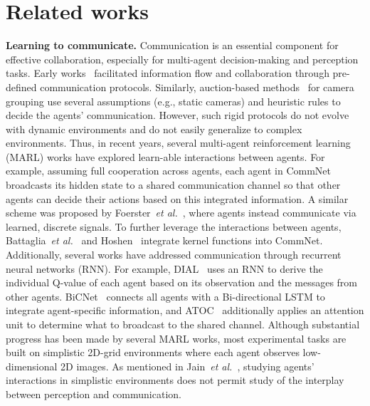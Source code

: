 \section{Related works}

\textbf{Learning to communicate.}
Communication is an essential component for effective collaboration, especially for multi-agent decision-making and perception tasks.  
Early works~\cite{tan1993multi,melo2011querypomdp} facilitated information flow and collaboration through pre-defined communication protocols. Similarly, auction-based methods~\cite{li2010auction,qureshi2008smart} for camera grouping use several assumptions (e.g., static cameras) and heuristic rules to decide the agents’ communication. 
However, such rigid protocols do not evolve with dynamic environments and do not easily generalize to complex environments.  
Thus, in recent years, several multi-agent reinforcement learning (MARL) works have explored learn-able interactions between agents.  
For example, assuming full cooperation across agents, each agent in CommNet~\cite{sukhbaatar2016learning} broadcasts its hidden state to a shared communication channel so that other agents can decide their actions based on this integrated information.  
A similar scheme was proposed by Foerster~\textit{et al.}~\cite{foerster2016learning}, where agents instead communicate via learned, discrete signals.  
To further leverage the interactions between agents, Battaglia~\textit{et al.}~\cite{battaglia2016interaction} and Hoshen~\cite{hoshen2017vain} integrate kernel functions into CommNet.  
Additionally, several works have addressed communication through recurrent neural networks (RNN). 
For example, DIAL~\cite{foerster2016dial} uses an RNN to derive the individual Q-value of each agent based on its observation and the messages from other agents.
BiCNet~\cite{peng2017multiagent} connects all agents with a Bi-directional LSTM to integrate agent-specific information, and ATOC~\cite{jiang2018learning} additionally applies an attention unit to determine what to broadcast to the shared channel.  
Although substantial progress has been made by several MARL works, most experimental tasks are built on simplistic 2D-grid environments where each agent observes low-dimensional 2D images. 
As mentioned in Jain~\textit{et al.}~\cite{jain2019two}, studying agents' interactions in simplistic environments does not permit study of the interplay between perception and communication. 

